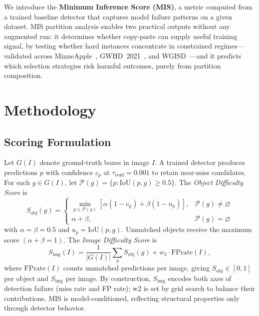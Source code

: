 \documentclass[conference,a4paper]{IEEEtran}
\begin{document}
We introduce the \textbf{Minimum Inference Score (MIS)}, a
metric computed from a trained baseline detector that captures
model failure patterns on a given dataset.
MIS partition analysis enables two practical outputs without
any augmented run: it determines whether copy-paste can supply
useful training signal, by testing whether hard instances
concentrate in constrained regimes---validated across
MinneApple~\cite{hani2020minneapple},
GWHD~2021~\cite{david2021global}, and
WGISD~\cite{santos2020grape}---and it predicts which selection
strategies risk harmful outcomes, purely from partition
composition.


\section{Methodology}
\subsection{Scoring Formulation}

Let $G(I)$ denote ground-truth boxes in image $I$.
A trained detector produces predictions $p$ with confidence $c_p$ at
$\tau_{\mathrm{conf}}{=}0.001$ to retain near-miss candidates.
For each $g\in G(I)$, let
$\mathcal{P}(g){=}\{p:\mathrm{IoU}(p,g){\ge}0.5\}$.
The \textit{Object Difficulty Score} is
\begin{equation}
S_{\mathrm{obj}}(g) =
\begin{cases}
  \min_{p \in \mathcal{P}(g)}\!
    [\alpha(1{-}c_p) + \beta(1{-}u_p)],
    & \mathcal{P}(g) \neq \varnothing \\[2pt]
  \alpha + \beta, & \mathcal{P}(g) = \varnothing
\end{cases}
\label{eq:obj}
\end{equation}
with $\alpha{=}\beta{=}0.5$ and $u_p{=}\mathrm{IoU}(p,g)$.
Unmatched objects receive the maximum score $(\alpha{+}\beta{=}1)$.
The \textit{Image Difficulty Score} is
\begin{equation}
S_{\mathrm{img}}(I)
  = \frac{1}{|G(I)|}\sum_{g} S_{\mathrm{obj}}(g)
  + w_2 \cdot \mathrm{FPrate}(I),
\label{eq:img}
\end{equation}
where $\mathrm{FPrate}(I)$ counts unmatched predictions per image,
giving $S_{\mathrm{obj}}\in[0,1]$ per object and $S_{\mathrm{img}}$
per image. By construction,  $S_{\mathrm{img}}$ encodes both
axes of detection failure (miss rate and FP rate); w2 is set
by grid search to balance their contributions.
MIS is model-conditioned, reflecting structural
properties only through detector behavior.
\end{document}
